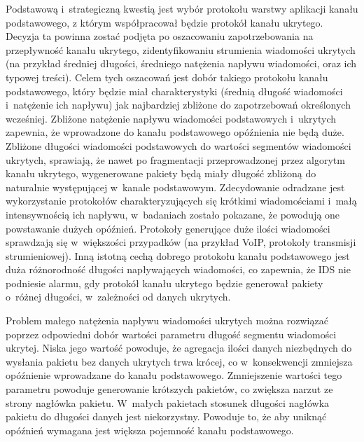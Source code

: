 \documentclass[a4paper, twoside, 12pt]{report}
\begin{document}
       Podstawową i~strategiczną kwestią jest wybór protokołu warstwy aplikacji kanału podstawowego,
       z którym współpracował będzie protokół kanału ukrytego. Decyzja ta powinna zostać
       podjęta po oszacowaniu zapotrzebowania na przepływność kanału ukrytego,
       zidentyfikowaniu strumienia wiadomości ukrytych (na przykład średniej długości,
       średniego natężenia napływu wiadomości, oraz ich typowej treści).
       Celem tych oszacowań jest dobór takiego protokołu
       kanału podstawowego, który będzie miał charakterystyki (średnią długość wiadomości
       i~natężenie ich napływu) jak najbardziej zbliżone do zapotrzebowań określonych
       wcześniej. Zbliżone natężenie napływu wiadomości podstawowych i~ukrytych zapewnia,
       że wprowadzone do kanału podstawowego opóźnienia nie będą duże.
       Zbliżone długości wiadomości podstawowych do wartości segmentów wiadomości ukrytych,
       sprawiają, że nawet po fragmentacji przeprowadzonej przez algorytm kanału ukrytego,
       wygenerowane pakiety będą miały długość zbliżoną do naturalnie występującej
       w~kanale podstawowym. Zdecydowanie odradzane jest wykorzystanie protokołów
       charakteryzujących się krótkimi wiadomościami i~małą intensywnością ich napływu,
       w~badaniach zostało pokazane, że powodują one powstawanie dużych opóźnień.
       Protokoły generujące duże ilości wiadomości sprawdzają się w~większości
       przypadków (na przykład VoIP, protokoły transmisji strumieniowej).
       Inną istotną cechą dobrego protokołu kanału podstawowego jest duża różnorodność
       długości napływających wiadomości, co zapewnia, że IDS nie podniesie alarmu,
       gdy protokół kanału ukrytego będzie generował pakiety o~różnej długości,
       w~zależności od danych ukrytych.

       Problem małego natężenia napływu wiadomości ukrytych można rozwiązać poprzez
       odpowiedni dobór wartości parametru długość segmentu wiadomości ukrytej.
       Niska jego wartość powoduje, że agregacja ilości danych niezbędnych do
       wysłania pakietu bez danych ukrytych trwa krócej, co w~konsekwencji zmniejsza
       opóźnienie wprowadzane do kanału podstawowego. Zmniejszenie wartości tego parametru powoduje generowanie
       krótszych pakietów, co zwiększa narzut ze strony nagłówka pakietu. W~małych
       pakietach stosunek długości nagłówka pakietu do długości danych jest niekorzystny.
       Powoduje to, że aby uniknąć opóźnień wymagana jest większa pojemność kanału
       podstawowego.
\end{document}
